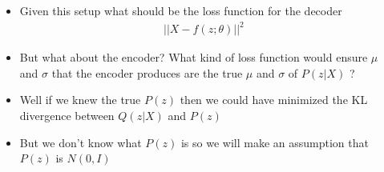 \begin{frame}
\begin{columns}
\begin{overlayarea}{\textwidth}{\textheight}
		\end{overlayarea}
		\begin{overlayarea}{\textwidth}{\textheight}
			\begin{itemize}\justifying
				\item<1-> Given this setup what should be the loss function for the decoder
				\begin{align*}
					||X - f(z; \theta)||^2
				\end{align*}
				\item<2-> But what about the encoder? What kind of loss function would ensure $\mu$ and $\sigma$ that the encoder produces are the true $\mu$ and $\sigma$ of $P(z|X)$ ?
				\item<3-> Well if we knew the true $P(z)$ then we could have minimized the KL divergence between $Q(z|X)$ and $P(z)$
				\item<4-> But we don't know what $P(z)$ is so we will make an assumption that $P(z)$ is $N(0, I)$
			\end{itemize}
		\end{overlayarea}
	\end{columns}
\end{frame}


